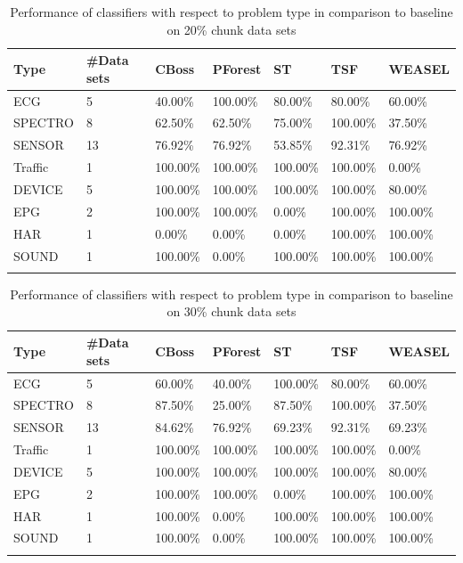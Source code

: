 \begin{table}[!htb]
	\setlength\extrarowheight{2pt} %
	\begin{tabularx}{\textwidth}{|X|X|X|X|X|X|X|}
	\hline
	\textbf{Type} & \textbf{\#Data sets} & \textbf{CBoss} & \textbf{PForest} & \textbf{ST} & \textbf{TSF} & \textbf{WEASEL} \\ \hline
		ECG & 5 & 40.00\% & 100.00\% & 80.00\% & 80.00\% & 60.00\% \\ \hline
		SPECTRO & 8 &62.50\% & 62.50\% & 75.00\% & 100.00\% & 37.50\% \\ \hline
		SENSOR & 13 & 76.92\% & 76.92\% & 53.85\% & 92.31\% & 76.92\% \\ \hline
		Traffic & 1 & 100.00\% & 100.00\% & 100.00\% & 100.00\% & 0.00\% \\ \hline
		DEVICE & 5 & 100.00\% & 100.00\% & 100.00\% & 100.00\% & 80.00\% \\ \hline
		EPG & 2 & 100.00\% & 100.00\% & 0.00\% & 100.00\% & 100.00\% \\ \hline
		HAR & 1 & 0.00\% & 0.00\% & 0.00\% & 100.00\% & 100.00\% \\ \hline
		SOUND & 1 & 100.00\% & 0.00\% & 100.00\% & 100.00\% & 100.00\% \\ \hline
  \caption{Performance of classifiers with respect to problem type in comparison to baseline on 20\% chunk data sets}
  \end{tabularx}
\end{table}

\begin{table}[!htb]
	\setlength\extrarowheight{2pt} %
	\begin{tabularx}{\textwidth}{|X|X|X|X|X|X|X|}
	\hline
	\textbf{Type} & \textbf{\#Data sets} & \textbf{CBoss} & \textbf{PForest} & \textbf{ST} & \textbf{TSF} & \textbf{WEASEL} \\ \hline
		ECG & 5 & 60.00\% & 40.00\% & 100.00\% & 80.00\% & 60.00\% \\ \hline
		SPECTRO & 8 &87.50\% & 25.00\% & 87.50\% & 100.00\% & 37.50\% \\ \hline
		SENSOR & 13 & 84.62\% & 76.92\% & 69.23\% & 92.31\% & 69.23\% \\ \hline
		Traffic & 1 & 100.00\% & 100.00\% & 100.00\% & 100.00\% & 0.00\% \\ \hline
		DEVICE & 5 & 100.00\% & 100.00\% & 100.00\% & 100.00\% & 80.00\% \\ \hline
		EPG & 2 & 100.00\% & 100.00\% & 0.00\% & 100.00\% & 100.00\% \\ \hline
		HAR & 1 & 100.00\% & 0.00\% & 100.00\% & 100.00\% & 100.00\% \\ \hline
		SOUND & 1 & 100.00\% & 0.00\% & 100.00\% & 100.00\% & 100.00\% \\ \hline
  \caption{Performance of classifiers with respect to problem type in comparison to baseline on 30\% chunk data sets}
  \end{tabularx}
\end{table}

